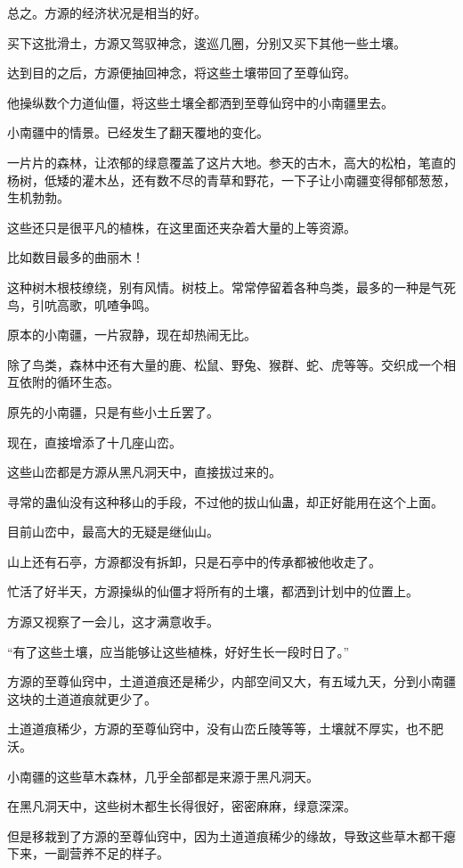 \begin{this_body}
总之。方源的经济状况是相当的好。

买下这批滑土，方源又驾驭神念，逡巡几圈，分别又买下其他一些土壤。

达到目的之后，方源便抽回神念，将这些土壤带回了至尊仙窍。

他操纵数个力道仙僵，将这些土壤全都洒到至尊仙窍中的小南疆里去。

小南疆中的情景。已经发生了翻天覆地的变化。

一片片的森林，让浓郁的绿意覆盖了这片大地。参天的古木，高大的松柏，笔直的杨树，低矮的灌木丛，还有数不尽的青草和野花，一下子让小南疆变得郁郁葱葱，生机勃勃。

这些还只是很平凡的植株，在这里面还夹杂着大量的上等资源。

比如数目最多的曲丽木！

这种树木根枝缭绕，别有风情。树枝上。常常停留着各种鸟类，最多的一种是气死鸟，引吭高歌，叽喳争鸣。

原本的小南疆，一片寂静，现在却热闹无比。

除了鸟类，森林中还有大量的鹿、松鼠、野兔、猴群、蛇、虎等等。交织成一个相互依附的循环生态。

原先的小南疆，只是有些小土丘罢了。

现在，直接增添了十几座山峦。

这些山峦都是方源从黑凡洞天中，直接拔过来的。

寻常的蛊仙没有这种移山的手段，不过他的拔山仙蛊，却正好能用在这个上面。

目前山峦中，最高大的无疑是继仙山。

山上还有石亭，方源都没有拆卸，只是石亭中的传承都被他收走了。

忙活了好半天，方源操纵的仙僵才将所有的土壤，都洒到计划中的位置上。

方源又视察了一会儿，这才满意收手。

“有了这些土壤，应当能够让这些植株，好好生长一段时日了。”

方源的至尊仙窍中，土道道痕还是稀少，内部空间又大，有五域九天，分到小南疆这块的土道道痕就更少了。

土道道痕稀少，方源的至尊仙窍中，没有山峦丘陵等等，土壤就不厚实，也不肥沃。

小南疆的这些草木森林，几乎全部都是来源于黑凡洞天。

在黑凡洞天中，这些树木都生长得很好，密密麻麻，绿意深深。

但是移栽到了方源的至尊仙窍中，因为土道道痕稀少的缘故，导致这些草木都干瘪下来，一副营养不足的样子。


\end{this_body}
